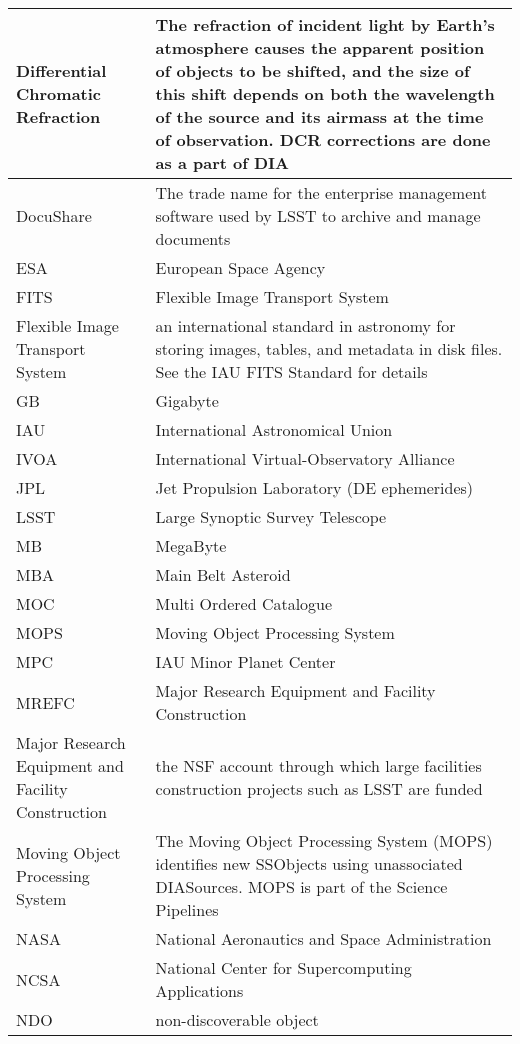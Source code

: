 \begin{longtable}{|p{}|p{}|}
Differential Chromatic Refraction & The refraction of incident light by Earth's atmosphere causes the apparent position of objects to be shifted, and the size of this shift depends on both the wavelength of the source and its \gls{airmass} at the time of observation. \gls{DCR} corrections are done as a part of \gls{DIA} \\\hline
DocuShare & The trade name for the enterprise management software used by \gls{LSST} to archive and manage documents \\\hline
ESA & European Space Agency \\\hline
FITS & \gls{Flexible Image Transport System} \\\hline
Flexible Image Transport System & an international standard in astronomy for storing images, tables, and \gls{metadata} in disk files. See the \gls{IAU} \gls{FITS} Standard for details \\\hline
GB & Gigabyte \\\hline
IAU & International Astronomical Union \\\hline
IVOA & International Virtual-Observatory Alliance \\\hline
JPL & Jet Propulsion Laboratory (DE ephemerides) \\\hline
LSST & Large Synoptic Survey Telescope \\\hline
MB & MegaByte \\\hline
MBA & Main Belt Asteroid \\\hline
MOC & Multi Ordered Catalogue \\\hline
MOPS & Moving \gls{Object} Processing System \\\hline
MPC & \gls{IAU} Minor Planet \gls{Center} \\\hline
MREFC & Major Research Equipment and Facility \gls{Construction} \\\hline
Major Research Equipment and Facility \gls{Construction} & the \gls{NSF} account through which large facilities construction projects such as \gls{LSST} are funded \\\hline
Moving \gls{Object} Processing System & The Moving \gls{Object} Processing System (\gls{MOPS}) identifies new SSObjects using unassociated DIASources. \gls{MOPS} is part of the \gls{Science Pipelines} \\\hline
NASA & National Aeronautics and Space Administration \\\hline
NCSA & National \gls{Center} for Supercomputing Applications \\\hline
NDO & non-discoverable object \\\hline

\end{longtable}
